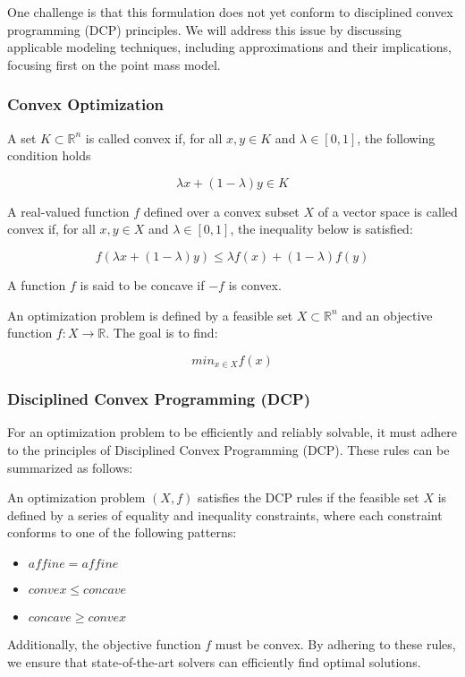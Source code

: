One challenge is that this formulation does not yet conform to disciplined convex programming (DCP) principles.
We will address this issue by discussing applicable modeling techniques, including approximations and their implications, focusing first on the point
mass model.

\subsubsection{Convex Optimization}

A set $K\subset \mathbb{R}^n$ is called convex if, for all $x, y\in K$ and $\lambda\in [0, 1]$, the following condition holds

\begin{equation}
	\lambda x + (1-\lambda) y \in K
	\label{eq:convex_set_criteria}
\end{equation}

A real-valued function $f$ defined over a convex subset $X$ of a vector space is called convex if, for all $x,y\in X$ and $\lambda\in [0,1]$, the inequality below is satisfied:

\begin{equation}
	f(\lambda x + (1-\lambda) y) \leq \lambda f(x) + (1-\lambda) f(y)
	\label{eq:convex_function_criteria}
\end{equation}

A function $f$ is said to be concave if $-f$ is convex.

An optimization problem is defined by a feasible set $X\subset \mathbb{R}^n$ and an objective function $f:X\to \mathbb{R}$.
The goal is to find:

\[ min_{x\in X}f(x) \]

\subsubsection{Disciplined Convex Programming (DCP)}

For an optimization problem to be efficiently and reliably solvable, it must adhere to the principles of Disciplined Convex
Programming (DCP).
These rules can be summarized as follows:

An optimization problem $(X,f)$ satisfies the DCP rules if the feasible set $X$ is defined by a series of equality and inequality constraints, where each constraint conforms to one of the following patterns:
\begin{itemize}
	\item $affine = affine$
	\item $convex\leq concave$
	\item $concave\geq convex$
\end{itemize}
Additionally, the objective function $f$ must be convex.
By adhering to these rules, we ensure that state-of-the-art solvers can efficiently find optimal solutions.

